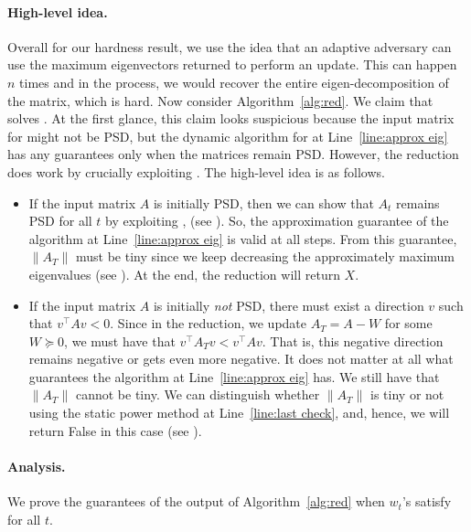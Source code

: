 \documentclass[11pt]{article}
\newcommand\vv{\boldsymbol{\mathit{v}}}
\newcommand\ww{\boldsymbol{\mathit{w}}}
\renewcommand\AA{\boldsymbol{\mathit{A}}}
\newcommand\WW{\boldsymbol{\mathit{W}}}
\newcommand\XX{\boldsymbol{\mathit{X}}}
\begin{document}
\paragraph{High-level idea.}
 Overall for our hardness result, we use the idea that an adaptive adversary can use the maximum eigenvectors returned to perform an update. This can happen $n$ times and in the process, we would recover the entire eigen-decomposition of the matrix, which is hard. Now consider Algorithm~\ref{alg:red}. We claim that  solves . 
At the first glance, this claim looks suspicious because the input matrix for  might not be PSD, but the dynamic algorithm for  at Line~\ref{line:approx eig} has any guarantees only when the matrices remain PSD. 
However, the reduction does work by crucially exploiting . The high-level idea is as follows. 
\begin{itemize}
    \item If the input matrix $\AA$ is initially PSD, then we can show that $\AA_t$ remains PSD for all $t$  by exploiting , (see ). So, the approximation guarantee of the algorithm at Line~\ref{line:approx eig} is valid at all steps.
    From this guarantee, $\|\AA_T\|$ must be tiny since we keep decreasing the approximately maximum eigenvalues (see ). At the end, the reduction will return $\XX$.
    \item If the input matrix $\AA$ is initially \emph{not} PSD, there must exist a direction $\vv$ such that $\vv^{\top}\AA\vv <0$. Since in the reduction, we update $\AA_T = \AA - \WW$ for some $\WW \succeq 0$, we must have that $\vv^{\top}\AA_T\vv <\vv^{\top}\AA\vv$. That is, this negative direction remains negative or gets even more negative. It does not matter at all what guarantees the algorithm at Line~\ref{line:approx eig} has. We still have that $\|\AA_T\|$ cannot be tiny. We can distinguish whether $\|\AA_T\|$ is tiny or not using the static power method at Line~\ref{line:last check}, and, hence, we will return {\sc False} in this case (see ).
\end{itemize}






\paragraph{Analysis.}
We prove the guarantees of the output of Algorithm~\ref{alg:red} when $\ww_t$'s satisfy  for all $t$.
\end{document}
